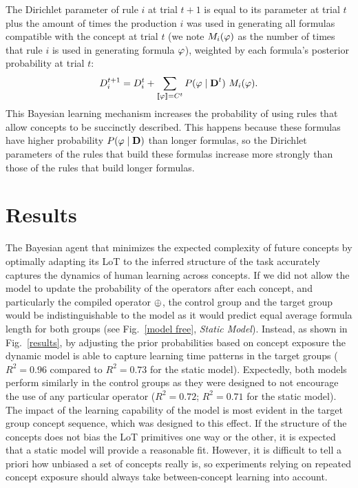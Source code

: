 The Dirichlet parameter of rule $i$ at trial $t+1$ is equal to its parameter at trial $t$ plus the amount of times the production $i$ was used in generating all formulas compatible with the concept at trial $t$ (we note $M_{i}(\varphi)$ as the number of times that rule $i$ is used in generating formula $\varphi$), weighted by each formula's posterior probability at trial $t$:
 \begin{equation}
 D_{i}^{t+1}=D_{i}^{t}+\sum_{\llbracket \varphi\rrbracket=C^t} P(\varphi\mid \textbf{D}^{t}) \ M_{i}(\varphi).
 \label{Dirichlet}
 \end{equation}
This Bayesian learning mechanism increases the probability of using rules that allow concepts to be succinctly described. This happens because these formulas have higher probability $P(\varphi\mid \textbf{D})$ than longer formulas, so the Dirichlet parameters of the rules that build these formulas increase more strongly than those of the rules that build longer formulas.   

\section{Results}

The Bayesian agent that minimizes the expected complexity of future concepts by optimally adapting its LoT to the inferred structure of the task accurately captures the dynamics of human learning across concepts. If we did not allow the model to update the probability of the operators after each concept, and particularly the compiled operator $\oplus$, the control group and the target group would be indistinguishable to the model as it would predict equal average formula length for both groups (see Fig.~\ref{model free}, {\em Static Model}). Instead, as shown in Fig.~\ref{results}, by adjusting the prior probabilities based on concept exposure the dynamic model is able to capture learning time patterns in the target groups ($R^{2}=0.96$ compared to $R^{2}=0.73$ for the static model). Expectedly, both models perform similarly in the control groups as they were designed to not encourage the use of any particular operator ($R^{2}=0.72$; $R^{2}=0.71$ for the static model). The impact of the learning capability of the model is most evident in the target group concept sequence, which was designed to this effect. If the structure of the concepts does not bias the LoT primitives one way or the other, it is expected that a static model will provide a reasonable fit. However, it is difficult to tell a priori how unbiased a set of concepts really is, so experiments relying on repeated concept exposure should always take between-concept learning into account.


